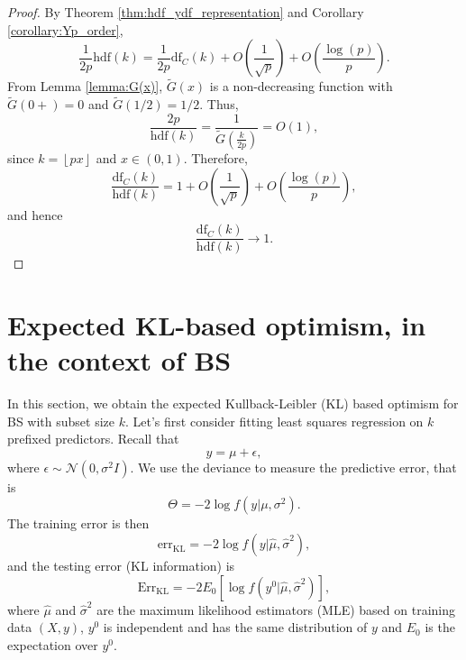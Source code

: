 \dfasycorollary*
\begin{proof}
	By Theorem \ref{thm:hdf_ydf_representation} and Corollary \ref{corollary:Yp_order},
	\begin{equation*}
	\frac{1}{2p} \text{hdf}(k) = \frac{1}{2p}\text{df}_C(k) + O\left(\frac{1}{\sqrt{p}}\right) + O\left(\frac{\log(p)}{p} \right).
	\end{equation*}
	From Lemma \ref{lemma:G(x)}, $\tilde{G}(x)$ is a non-decreasing function with $\tilde{G}(0+)=0$ and $\tilde{G}(1/2)=1/2$. Thus, 
	\begin{equation*}
	\frac{2p}{\text{hdf}(k)} = \frac{1}{\tilde{G}\left(\frac{k}{2p}\right)} = O(1),
	\end{equation*}
	since $k=\left \lfloor{px}\right \rfloor$ and $x\in(0,1)$. Therefore, 
	\begin{equation*}
	\frac{\text{df}_C(k)}{\text{hdf}(k)} = 1 + O\left(\frac{1}{\sqrt{p}}\right) + O\left(\frac{\log(p)}{p} \right),
	\end{equation*}
	and hence
	\begin{equation*}
	\frac{\text{df}_C(k)}{\text{hdf}(k)} \to 1.
	\end{equation*}
\end{proof}

\section{Expected KL-based optimism, in the context of BS }
\label{sec:expectedkl_bs}
In this section, we obtain the expected Kullback-Leibler (KL) based optimism for BS with subset size $k$. Let's first consider fitting least squares regression on $k$ prefixed predictors. Recall that 
\begin{equation*}
y = \mu + \epsilon,
\end{equation*}
where $\epsilon \sim \mathcal{N}(0,\sigma^2 I)$. We use the deviance to measure the predictive error, that is 
\begin{equation*}
\Theta=-2 \log f(y|\mu,\sigma^2).
\end{equation*}
The training error is then 
$$\text{err}_{\text{KL}} = -2 \log f (y|\hat{\mu},\hat{\sigma}^2),$$
and the testing error (KL information) is
$$\text{Err}_{\text{KL}}  = -2 E_0 \left[ \log f(y^0|\hat{\mu},\hat{\sigma}^2)\right],$$
where $\hat{\mu}$ and $\hat{\sigma}^2$ are the maximum likelihood estimators (MLE) based on training data $(X,y)$, $y^0$ is independent and has the same distribution of $y$ and $E_0$ is the expectation over $y^0$. 

